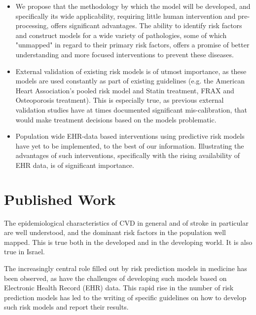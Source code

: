 \documentclass[a4paper,12pt]{article}
\begin{document}
	\begin{itemize}
		
		\item We propose that the methodology by which the model will be developed, and specifically its wide applicability, requiring little human intervention and pre-processing, offers significant advantages. The ability to identify risk factors and construct models for a wide variety of pathologies, some of which "unmapped" in regard to their primary risk factors, offers a promise of better understanding and more focused interventions to prevent these diseases.
		
		\item External validation of existing risk models is of utmost importance\cite{Moons2012}, as these models are used constantly as part of existing guidelines (e.g. the American Heart Association's pooled risk model and Statin treatment\cite{Goff2014}, FRAX and Osteoporosis treatment\cite{Kanis2008}). This is especially true, as previous external validation studies have at times documented significant mis-calibration\cite{Bastuji-Garin2002,Dagan2017}, that would make treatment decisions based on the models problematic.
		
		\item Population wide EHR-data based interventions using predictive risk models have yet to be implemented, to the best of our information. Illustrating the advantages of such interventions, specifically with the rising availability of EHR data, is of significant importance.
		
	\end{itemize}
	
	\section{Published Work}
	
	The epidemiological characteristics of CVD in general and of stroke in particular are well understood\cite{Koton2014,Vangen-Loenne2017}, and the dominant risk factors in the population well mapped\cite{Yusuf2004,ODonnell2016}. This is true both in the developed and in the developing world\cite{Lozano2012}. It is also true in Israel\cite{ICDC2017}.
	
	The increasingly central role filled out by risk prediction models in medicine has been observed\cite{Moons2009}, as have the challenges of developing such models based on Electronic Health Record (EHR) data\cite{Goldstein2016,Goldstein2017}. This rapid rise in the number of risk prediction models has led to the writing of specific guidelines on how to develop such risk models and report their results\cite{Collins2015}.
	
\end{document}
